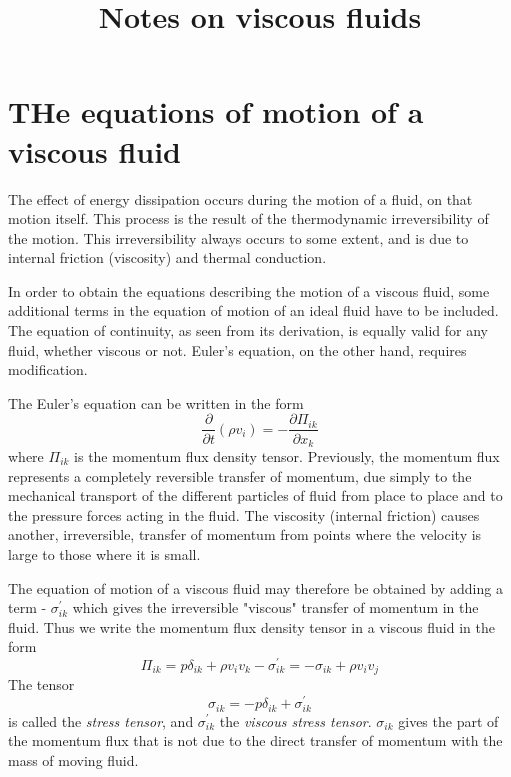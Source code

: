 \documentclass[conference]{IEEEtran}
\theoremstyle{definition}
\theoremstyle{remark}
\begin{document}
    \title{Notes on viscous fluids}

    \author{}

    \maketitle

    \section{THe equations of motion of a viscous fluid}

    The effect of energy dissipation occurs during the motion of a fluid, on that motion itself. This process is the result of the thermodynamic irreversibility of the motion. This irreversibility always occurs to some extent, and is due to internal friction (viscosity) and thermal conduction.

    In order to obtain the equations describing the motion of a viscous fluid, some additional terms in the equation of motion of an ideal fluid have to be included. The equation of continuity, as seen from its derivation, is equally valid for any fluid, whether viscous or not. Euler's equation, on the other hand, requires modification.

    The Euler's equation can be written in the form
    \[
        \dfrac{\partial}{\partial t} (\rho v_i) = -\dfrac{\partial \Pi_{ik}}{\partial x_k}
    \]
    where $\Pi_{ik}$ is the momentum flux density tensor. Previously, the momentum flux represents a completely reversible transfer of momentum, due simply to the mechanical transport of the different particles of fluid from place to place and to the pressure forces acting in the fluid. The viscosity (internal friction) causes another, irreversible, transfer of momentum from points where the velocity is large to those where it is small.

    The equation of motion of a viscous fluid may therefore be obtained by adding a term - $\sigma^\prime_{ik}$ which gives the irreversible "viscous" transfer of momentum in the fluid. Thus we write the momentum flux density tensor in a viscous fluid in the form
    \begin{equation}
        \Pi_{ik} = p\delta_{ik} + \rho v_i v_k - \sigma^\prime_{ik} = -\sigma_{ik} + \rho v_i v_j
    \end{equation}
    The tensor
    \begin{equation}
        \sigma_{ik} = -p\delta_{ik} + \sigma^\prime_{ik}
    \end{equation}
    is called the \emph{stress tensor}, and $\sigma^\prime_{ik}$ the \emph{viscous stress tensor}. $\sigma_{ik}$ gives the part of the momentum flux that is not due to the direct transfer of momentum with the mass of moving fluid.
\end{document}
